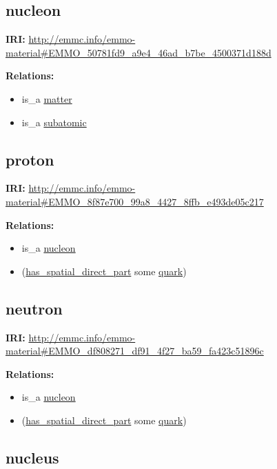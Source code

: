 \documentclass[a4paper,]{report}
\providecommand{\tightlist}{%
  \setlength{\itemsep}{0pt}\setlength{\parskip}{0pt}}
\begin{document}
\hypertarget{nucleon-1}{%
\subsection{nucleon}\label{nucleon-1}}

\textbf{IRI:}
\url{http://emmc.info/emmo-material\#EMMO_50781fd9_a9e4_46ad_b7be_4500371d188d}

\textbf{Relations:}

\begin{itemize}
\tightlist
\item
  is\_a \protect\hyperlink{matter}{matter}
\item
  is\_a \protect\hyperlink{subatomic}{subatomic}
\end{itemize}

\hypertarget{proton-1}{%
\subsection{proton}\label{proton-1}}

\textbf{IRI:}
\url{http://emmc.info/emmo-material\#EMMO_8f87e700_99a8_4427_8ffb_e493de05c217}

\textbf{Relations:}

\begin{itemize}
\tightlist
\item
  is\_a \protect\hyperlink{nucleon}{nucleon}
\item
  (\protect\hyperlink{has_spatial_direct_part}{has\_spatial\_direct\_part}
  some \protect\hyperlink{quark}{quark})
\end{itemize}

\hypertarget{neutron-1}{%
\subsection{neutron}\label{neutron-1}}

\textbf{IRI:}
\url{http://emmc.info/emmo-material\#EMMO_df808271_df91_4f27_ba59_fa423c51896c}

\textbf{Relations:}

\begin{itemize}
\tightlist
\item
  is\_a \protect\hyperlink{nucleon}{nucleon}
\item
  (\protect\hyperlink{has_spatial_direct_part}{has\_spatial\_direct\_part}
  some \protect\hyperlink{quark}{quark})
\end{itemize}

\hypertarget{nucleus-1}{%
\subsection{nucleus}\label{nucleus-1}}
\end{document}
